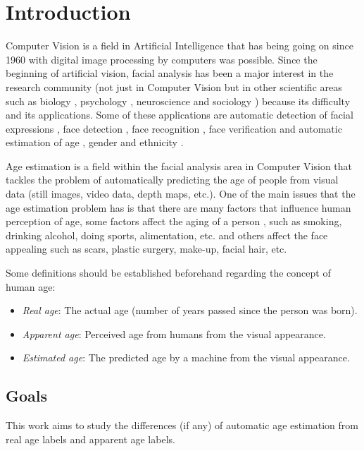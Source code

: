 \chapter{Introduction} \label{chap:introduction}

Computer Vision is a field in Artificial Intelligence that has being going on since 1960 with digital image processing by computers was possible. Since the beginning of artificial vision, facial analysis has been a major interest in the research community (not just in Computer Vision but in other scientific areas such as biology \cite{bhl24064}, psychology \cite{ekm02}, neuroscience \cite{freiwald2009face} and sociology \cite{kemper1978social}) because its difficulty and its applications. Some of these applications are automatic detection of facial expressions \cite{cohen2003facial}, face detection \cite{hsu2002face}, face recognition \cite{wright2009robust}, face verification \cite{taigman2014deepface} and automatic estimation of age \cite{4359348}, gender \cite{alexandre2010gender} and ethnicity \cite{hosoi2004ethnicity}.

Age estimation is a field within the facial analysis area in Computer Vision that tackles the problem of automatically predicting the age of people from visual data (still images, video data, depth maps, etc.). One of the main issues that the age estimation problem has is that there are many factors that influence human perception of age, some factors affect the aging of a person \cite{shephard1997aging}, such as smoking, drinking alcohol, doing sports, alimentation, etc. and others affect the face appealing such as scars, plastic surgery, make-up, facial hair, etc.

Some definitions should be established beforehand regarding the concept of human age:
\begin{itemize}
	\item \textit{Real age}: The actual age (number of years passed since the person was born).
	\item \textit{Apparent age}: Perceived age from humans from the visual appearance. 
	\item \textit{Estimated age}: The predicted age by a machine from the visual appearance.
\end{itemize}

\section{Goals}
This work aims to study the differences (if any) of automatic age estimation from real age labels and apparent age labels.

